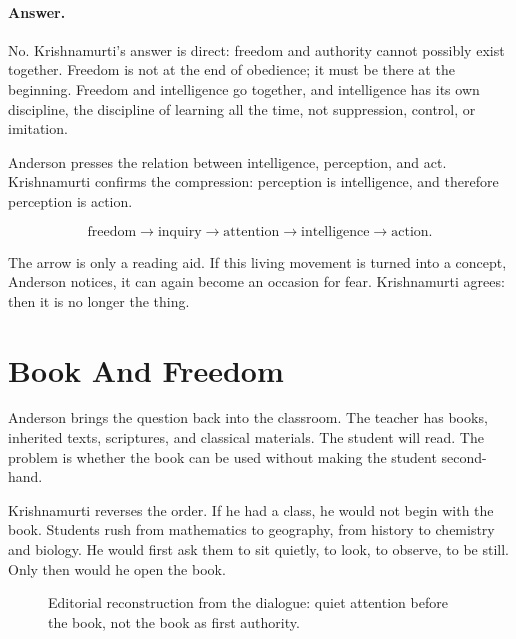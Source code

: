 \documentclass[11pt,oneside]{book}
\begin{document}
\paragraph{Answer.}
No. Krishnamurti's answer is direct: freedom and authority cannot possibly exist together. Freedom is not at the end of obedience; it must be there at the beginning. Freedom and intelligence go together, and intelligence has its own discipline, the discipline of learning all the time, not suppression, control, or imitation.

Anderson presses the relation between intelligence, perception, and act. Krishnamurti confirms the compression: perception is intelligence, and therefore perception is action.

\begin{equation}
\text{freedom}
\longrightarrow
\text{inquiry}
\longrightarrow
\text{attention}
\longrightarrow
\text{intelligence}
\longrightarrow
\text{action}.
\end{equation}

The arrow is only a reading aid. If this living movement is turned into a concept, Anderson notices, it can again become an occasion for fear. Krishnamurti agrees: then it is no longer the thing.

\section{Book And Freedom}

Anderson brings the question back into the classroom. The teacher has books, inherited texts, scriptures, and classical materials. The student will read. The problem is whether the book can be used without making the student second-hand.

Krishnamurti reverses the order. If he had a class, he would not begin with the book. Students rush from mathematics to geography, from history to chemistry and biology. He would first ask them to sit quietly, to look, to observe, to be still. Only then would he open the book.

\begin{figure}
\centering
{}
\caption{Editorial reconstruction from the dialogue: quiet attention before the book, not the book as first authority.}
\end{figure}
\end{document}
